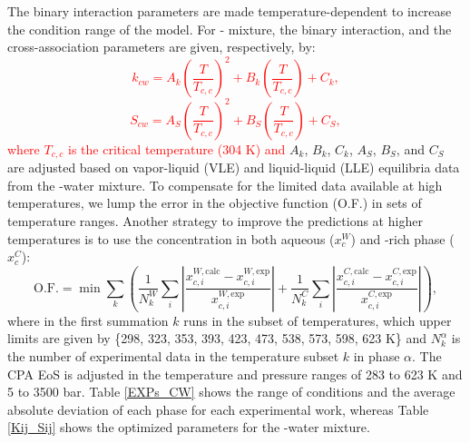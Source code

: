 The binary interaction parameters are made temperature-dependent to increase the condition range of the model. For - mixture, the binary interaction, and the cross-association parameters are given, respectively, by:
\textcolor{red}{
\begin{equation}
    k_{cw} = A_k \left ( {\frac{T}{T_{c,c}}} \right )^2 + B_k \left ( {\frac{T}{T_{c,c}}} \right ) + C_k,
    \label{Eq:kij}
\end{equation}
\begin{equation}
    S_{cw} = A_S \left ( {\frac{T}{T_{c,c}}} \right )^2 + B_S \left ( {\frac{T}{T_{c,c}}} \right ) + C_S,
    \label{Eq:Sij}
\end{equation}
where $T_{c,c}$ is the  critical temperature (304 K) and} $A_k$, $B_k$, $C_k$,  $A_S$, $B_S$, and $C_S$ are adjusted based on vapor-liquid (VLE) and liquid-liquid (LLE) equilibria data from the -water mixture. To compensate for the limited data available at high temperatures, we lump the error in the objective function (O.F.) in sets of temperature ranges. 
Another strategy to improve the predictions at higher temperatures is to use the  concentration in both aqueous ($x_c^W$) and -rich phase ($x_c^C$):
\begin{equation}
    \text{O.F.} = \min \sum_k \left (\frac{1}{N^W_k} \sum_i \left |\frac{ x_{c,i}^{W,\text{calc}}-x_{c,i}^{W,\text{exp}}}{ x_{c,i}^{W,\text{exp}}} \right | + \frac{1}{N^C_k} \sum_i \left |\frac{ x_{c,i}^{C,\text{calc}}-x_{c,i}^{C,\text{exp}}}{ x_{c,i}^{C,\text{exp}}} \right | \right ),
    \label{Eq:OF1}
\end{equation}
where in the first summation $k$ runs in the subset of temperatures, which upper limits are given by \{298, 323, 353, 393, 423, 473, 538, 573, 598, 623 K\} and $N_k^\alpha$ is the number of experimental data in the temperature subset $k$ in phase $\alpha$. The CPA EoS is adjusted in the temperature and pressure ranges of 283 to 623 K and 5 to 3500 bar. Table \ref{EXPs_CW} shows the range of conditions and the average absolute deviation of each phase for each experimental work, whereas Table \ref{Kij_Sij} shows the optimized parameters for the -water mixture.


